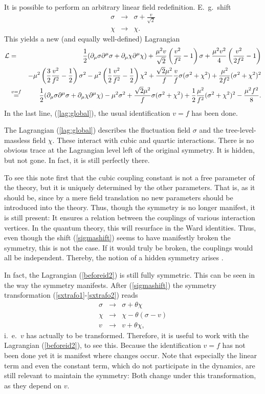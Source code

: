 \documentclass[final,twoside,12pt]{article}
\newcommand*{\La}{{\cal{L}}}
\newcommand*{\no}{\noindent}
\newcommand*{\bea}{\begin{eqnarray}}
\newcommand*{\eea}{\end{eqnarray}}
\newcommand*{\pd}{\partial}
\newcommand*{\pdm}{\pd_{\mu}}
\newcommand*{\pref}[1]{(\ref{#1})}
\newcommand*{\prefr}[2]{(\ref{#1}-\ref{#2})}
\newcommand*{\nn}{\nonumber}
\newcommand*{\1}{1\!\!\!\bot}
\begin{document}
It is possible to perform an arbitrary linear field redefinition. E.\ g.\ shift
\bea
\sigma&\to&\sigma+\frac{v}{\sqrt{2}}\label{sigmashift}\\
\chi&\to&\chi\nn.
\eea
\no This yields a new (and equally well-defined) Lagrangian
\bea
\La&=&\frac{1}{2}(\pdm\sigma\pd^\mu\sigma+\pdm\chi\pd^\mu\chi)+\frac{\mu^2v}{\sqrt{2}}\left(\frac{v^2}{f^2}-1\right)\sigma+\frac{\mu^2v^2}{4}\left(\frac{v^2}{2f^2}-1\right)\nn\\
&&-\mu^2\left(\frac{3}{2}\frac{v^2}{f^2}-\frac{1}{2}\right)\sigma^2-\mu^2\left(\frac{1}{2}\frac{v^2}{f^2}-\frac{1}{2}\right)\chi^2+\frac{\sqrt{2}\mu^2}{f}\frac{v}{f}\sigma(\sigma^2+\chi^2)+\frac{\mu^2}{2f^2}(\sigma^2+\chi^2)^2\label{beforeid2}\\
&\stackrel{v=f}{=}&\frac{1}{2}(\pdm\sigma\pd^\mu\sigma+\pdm\chi\pd^\mu\chi)-\mu^2\sigma^2+\frac{\sqrt{2}\mu^2}{f}\sigma(\sigma^2+\chi^2)+\frac{1}{2}\frac{\mu^2}{f^2}(\sigma^2+\chi^2)^2-\frac{\mu^2f^2}{8}\label{lag:global}.
\eea
\no In the last line, \pref{lag:global}, the usual \cite{Bohm:2001yx} identification $v=f$ has been done.

The Lagrangian \pref{lag:global} describes the fluctuation field $\sigma$ and the tree-level-massless field $\chi$. These interact with cubic and quartic interactions. There is no obvious trace at the Lagrangian level left of the original symmetry. It is hidden, but not gone. In fact, it is still perfectly there. 

To see this note first that the cubic coupling constant is not a free parameter of the theory, but it is uniquely determined by the other parameters. That is, as it should be, since by a mere field translation no new parameters should be introduced into the theory. Thus, though the symmetry is no longer manifest, it is still present: It ensures a relation between the couplings of various interaction vertices. In the quantum theory, this will resurface in the Ward identities. Thus, even though the shift \pref{sigmashift} seems to have manifestly broken the symmetry, this is not the case. If it would truly be broken, the couplings would all be independent. Thereby, the notion of a hidden symmetry arises \cite{O'Raifeartaigh:1978kv}.

In fact, the Lagrangian \pref{beforeid2} is still fully symmetric. This can be seen in the way the symmetry manifests. After \pref{sigmashift} the symmetry transformation \prefr{sxtrafo1}{sxtrafo2} reads
\bea
\sigma&\to&\sigma+\theta\chi\nn\\
\chi&\to&\chi-\theta(\sigma-v)\nn\\
v&\to&v+\theta\chi\nn,
\eea
\no i.\ e.\ $v$ has actually to be transformed. Therefore, it is useful to work with the Lagrangian \pref{beforeid2}, to see this. Because the identification $v=f$ has not been done yet it is manifest where changes occur. Note that especially the linear term and even the constant term, which do not participate in the dynamics, are still relevant to maintain the symmetry: Both change under this transformation, as they depend on $v$.
\end{document}
